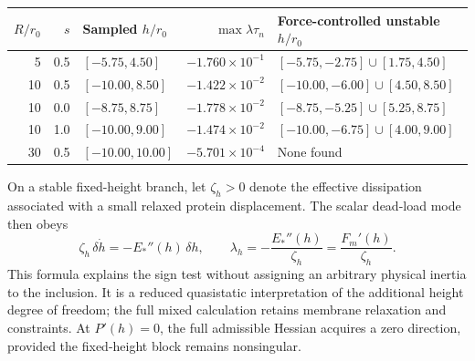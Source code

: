 \par\medskip\noindent\begin{minipage}{\linewidth}\centering\small
\begin{tabular}{rrlrl}\toprule
$R/r_0$ & $s$ & Sampled $h/r_0$ & $\max\lambda\tau_n$ & Force-controlled unstable $h/r_0$\\\midrule
5 & 0.5 & $[-5.75,4.50]$ & $-1.760\times10^{-1}$ & $[-5.75,-2.75]\cup[1.75,4.50]$\\
10 & 0.5 & $[-10.00,8.50]$ & $-1.422\times10^{-2}$ & $[-10.00,-6.00]\cup[4.50,8.50]$\\
10 & 0.0 & $[-8.75,8.75]$ & $-1.778\times10^{-2}$ & $[-8.75,-5.25]\cup[5.25,8.75]$\\
10 & 1.0 & $[-10.00,9.00]$ & $-1.474\times10^{-2}$ & $[-10.00,-6.75]\cup[4.00,9.00]$\\
30 & 0.5 & $[-10.00,10.00]$ & $-5.701\times10^{-4}$ & None found\\\bottomrule
\end{tabular}
\label{tab:ring-control-comparison}
\end{minipage}\par\medskip




On a stable fixed-height branch, let $\zeta_h>0$ denote the effective dissipation associated with a small relaxed protein displacement. The scalar dead-load mode then obeys
\begin{equation}
\zeta_h\,\delta\dot h=-E_*''(h)\,\delta h,
\qquad \lambda_h=-\frac{E_*''(h)}{\zeta_h}
=\frac{F_m'(h)}{\zeta_h}.
\label{eq:ring-height-mode}
\end{equation}
This formula explains the sign test without assigning an arbitrary physical inertia to the inclusion. It is a reduced quasistatic interpretation of the additional height degree of freedom; the full mixed calculation retains membrane relaxation and constraints. At $P'(h)=0$, the full admissible Hessian acquires a zero direction, provided the fixed-height block remains nonsingular.

